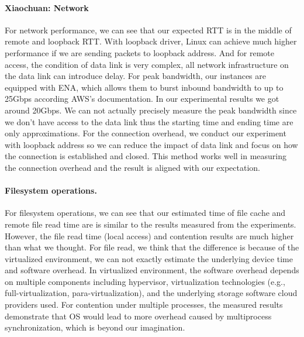 \paragraph{Xiaochuan: Network} For network performance, we can see that our expected RTT is in the middle of remote and loopback RTT. With loopback driver, Linux can achieve much higher performance if we are sending packets to loopback address. And for remote access, the condition of data link is very complex, all network infrastructure on the data link can introduce delay. For peak bandwidth, our instances are equipped with ENA, which allows them to burst inbound bandwidth to up to 25Gbps according AWS's documentation. In our experimental results we got around 20Gbps. We can not actually precisely measure the peak bandwidth since we don't have access to the data link thus the starting time and ending time are only approximations. For the connection overhead, we conduct our experiment with loopback address so we can reduce the impact of data link and focus on how the connection is established and closed. This method works well in measuring the connection overhead and the result is aligned with our expectation.

\paragraph{Filesystem operations.} For filesystem operations, we can see that our estimated time of file cache and remote file read time are is similar to the results measured from the experiments. However, the file read time (local access) and contention results are much higher than what we thought. For file read, we think that the difference is because of the virtualized environment, we can not exactly estimate the underlying device time and software overhead. In virtualized environment, the software overhead depends on multiple components including hypervisor, virtualization technologies (e.g., full-virtualization, para-virtualization), and the underlying storage software cloud providers used. For contention under multiple processes, the measured results demonstrate that OS would lead to more overhead caused by multiprocess synchronization, which is beyond our imagination.